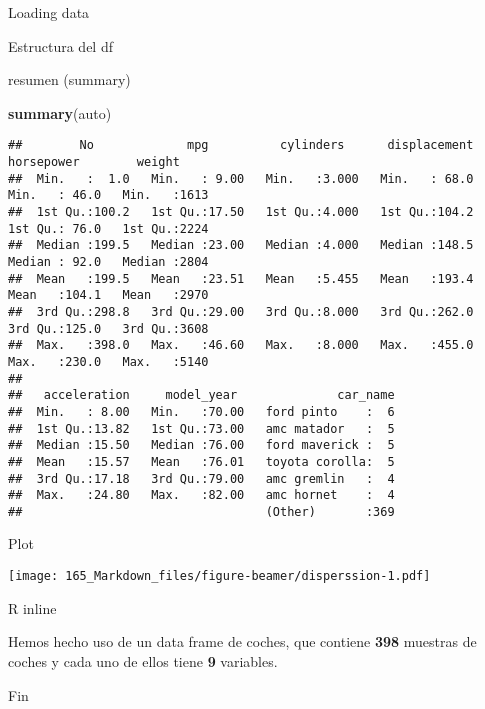 \documentclass[
  ignorenonframetext,
]{beamer}
\newenvironment{Shaded}{\begin{snugshade}}{\end{snugshade}}
\newcommand{\KeywordTok}[1]{\textcolor[rgb]{0.13,0.29,0.53}{\textbf{#1}}}
\newcommand{\NormalTok}[1]{#1}
\begin{document}
\begin{frame}[fragile]{Loading data}
\begin{block}{Estructura del df}
\end{block}

\begin{block}{resumen (summary)}

\begin{Shaded}
\begin{Highlighting}[]
  \KeywordTok{summary}\NormalTok{(auto)}
\end{Highlighting}
\end{Shaded}

\begin{verbatim}
##        No             mpg          cylinders      displacement     horsepower        weight    
##  Min.   :  1.0   Min.   : 9.00   Min.   :3.000   Min.   : 68.0   Min.   : 46.0   Min.   :1613  
##  1st Qu.:100.2   1st Qu.:17.50   1st Qu.:4.000   1st Qu.:104.2   1st Qu.: 76.0   1st Qu.:2224  
##  Median :199.5   Median :23.00   Median :4.000   Median :148.5   Median : 92.0   Median :2804  
##  Mean   :199.5   Mean   :23.51   Mean   :5.455   Mean   :193.4   Mean   :104.1   Mean   :2970  
##  3rd Qu.:298.8   3rd Qu.:29.00   3rd Qu.:8.000   3rd Qu.:262.0   3rd Qu.:125.0   3rd Qu.:3608  
##  Max.   :398.0   Max.   :46.60   Max.   :8.000   Max.   :455.0   Max.   :230.0   Max.   :5140  
##                                                                                                
##   acceleration     model_year              car_name  
##  Min.   : 8.00   Min.   :70.00   ford pinto    :  6  
##  1st Qu.:13.82   1st Qu.:73.00   amc matador   :  5  
##  Median :15.50   Median :76.00   ford maverick :  5  
##  Mean   :15.57   Mean   :76.01   toyota corolla:  5  
##  3rd Qu.:17.18   3rd Qu.:79.00   amc gremlin   :  4  
##  Max.   :24.80   Max.   :82.00   amc hornet    :  4  
##                                  (Other)       :369
\end{verbatim}

\end{block}

\begin{block}{Plot}

\texttt{[image: 165\_Markdown\_files/figure-beamer/disperssion-1.pdf]}

\end{block}

\end{frame}

\begin{frame}{R inline}
\protect\hypertarget{r-inline}{}

Hemos hecho uso de un data frame de coches, que contiene \textbf{398}
muestras de coches y cada uno de ellos tiene \textbf{9} variables.

Fin

\end{frame}
\end{document}
